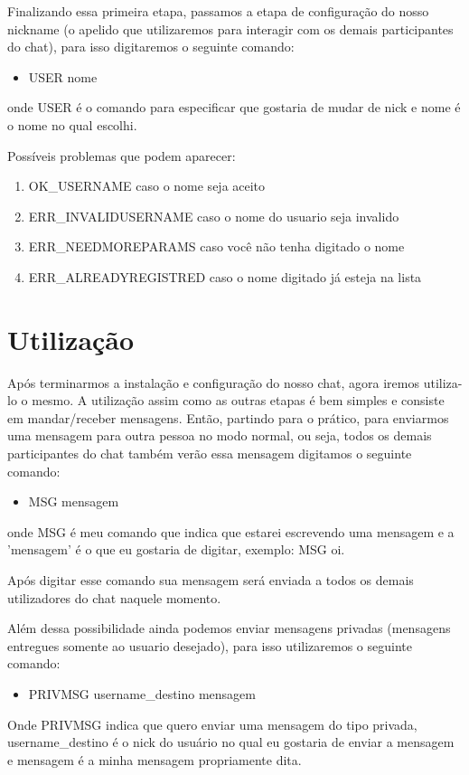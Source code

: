 \documentclass{abnt}
\begin{document}
	Finalizando essa primeira etapa, passamos a etapa de configuração do nosso nickname (o apelido que utilizaremos para interagir com os demais participantes do chat), para isso digitaremos o seguinte comando:
	\begin{itemize}
		\item USER nome	
	\end{itemize}
	onde USER é o comando para especificar que gostaria de mudar de nick e nome é o nome no qual escolhi.

	Possíveis problemas que podem aparecer:
	\begin{enumerate}
		
		\item  OK\_USERNAME caso o nome seja aceito
		\item  ERR\_INVALIDUSERNAME caso o nome do usuario seja invalido
		\item  ERR\_NEEDMOREPARAMS caso você não tenha digitado o nome
		\item  ERR\_ALREADYREGISTRED caso o nome digitado já esteja na lista	
	\end{enumerate}
	
	\section{Utilização}		
	Após terminarmos a instalação e configuração do nosso chat, agora iremos utiliza-lo o mesmo. A utilização assim como as outras etapas é bem simples e consiste em mandar/receber mensagens.
	Então, partindo para o prático, para enviarmos uma mensagem para outra pessoa no modo normal, ou seja, todos os demais participantes do chat também verão essa mensagem digitamos o seguinte comando:
	\begin{itemize}
		\item MSG mensagem 	
	\end{itemize}
	onde MSG é meu comando que indica que estarei escrevendo uma mensagem e a 'mensagem' é o que eu gostaria de digitar, exemplo: MSG oi.
	
	Após digitar esse comando sua mensagem será enviada a todos os demais utilizadores do chat naquele momento.
	
	Além dessa possibilidade ainda podemos enviar mensagens privadas (mensagens entregues somente ao usuario desejado), para isso utilizaremos o seguinte comando:
	\begin{itemize}
		\item PRIVMSG username\_destino mensagem
	\end{itemize}
	Onde PRIVMSG indica que quero enviar uma mensagem do tipo privada, username\_destino é o nick do usuário no qual eu gostaria de enviar a mensagem e mensagem é a minha mensagem propriamente dita.
\end{document}

